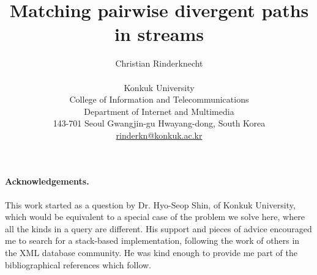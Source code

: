 \documentclass{article}
\title{Matching pairwise divergent paths in \XML streams}
\author{Christian Rinderknecht\\\\
{\small Konkuk University}\\
{\small College of Information and Telecommunications}\\
{\small Department of Internet and Multimedia}\\
{\small 143-701 Seoul Gwangjin-gu Hwayang-dong, South Korea}\\
{\small \url{rinderkn@konkuk.ac.kr}}
}
\newcommand\XML{\textsf{XML}\xspace}
\begin{document}
\maketitle



%







\paragraph{Acknowledgements.}

This work started as a question by Dr. Hyo-Seop Shin, of Konkuk
University, which would be equivalent to a special case of the problem
we solve here, where all the kinds in a query are different. His
support and pieces of advice encouraged me to search for a
stack\hyp{}based implementation, following the work of others in the
\XML database community. He was kind enough to provide me part of the
bibliographical references which follow.

%


\end{document}
